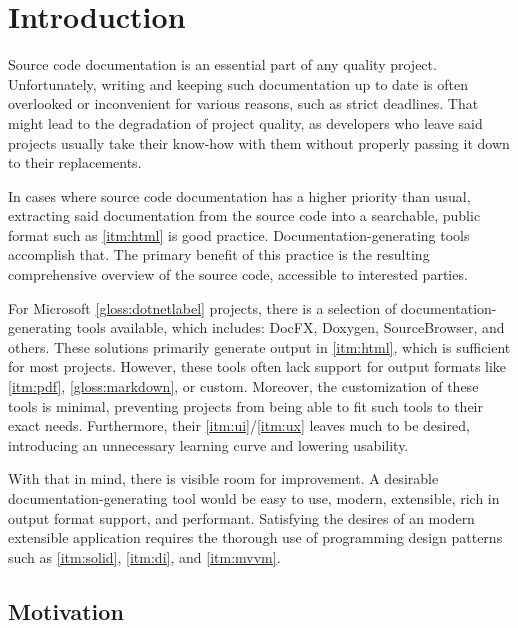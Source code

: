\chapter*{Introduction}

Source code documentation is an essential part of any quality project. Unfortunately, writing and keeping such documentation up to date is often overlooked or inconvenient for various reasons, such as strict deadlines. That might lead to the degradation of project quality, as developers who leave said projects usually take their know-how with them without properly passing it down to their replacements.

In cases where source code documentation has a higher priority than usual, extracting said documentation from the source code into a searchable, public format such as \ref{itm:html} is good practice. Documentation-generating tools accomplish that. The primary benefit of this practice is the resulting comprehensive overview of the source code, accessible to interested parties.

For Microsoft \ref{gloss:dotnetlabel} projects, there is a selection of documentation-generating tools available, which includes: DocFX, Doxygen, SourceBrowser, and others. These solutions primarily generate output in \ref{itm:html}, which is sufficient for most projects. However, these tools often lack support for output formats like \ref{itm:pdf}, \ref{gloss:markdown}, or custom. Moreover, the customization of these tools is minimal, preventing projects from being able to fit such tools to their exact needs. Furthermore, their \ref{itm:ui}/\ref{itm:ux} leaves much to be desired, introducing an unnecessary learning curve and lowering usability.

With that in mind, there is visible room for improvement. A desirable documentation-generating tool would be easy to use, modern, extensible, rich in output format support, and performant. Satisfying the desires of an modern extensible application requires the thorough use of programming design patterns such as \ref{itm:solid}, \ref{itm:di}, and \ref{itm:mvvm}.

\section*{Motivation}

